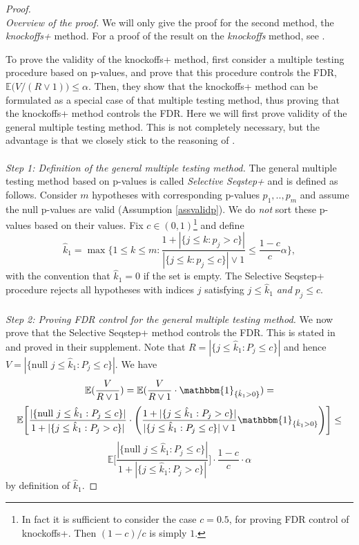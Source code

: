 \documentclass[11pt]{article}
\theoremstyle{plain}
\theoremstyle{definition}
\newcommand{\citt}{\citet}
\newcommand{\citp}{\citep}
\begin{document}
\begin{proof}
\phantom{.}
\\
\noindent \emph{Overview of the proof.}
We will only give the proof for the second  method, the \emph{knockoffs+} method. For a proof of  the result on the  \emph{knockoffs} method, see \citt{barber2015controlling}.

To prove the validity of the knockoffs+ method, \citt{barber2015controlling} first consider a multiple testing procedure based on  p-values, and prove that this procedure controls the  FDR, 
$\mathbb{E}\big(V/(R\vee1) \big)   \leq \alpha.$
Then, they show that the knockoffs+ method can be formulated as a special case of that multiple testing method, thus proving that the knockoffs+ method controls the FDR. Here we will first prove validity of the general multiple testing method. This is not completely necessary, but the advantage is that we closely stick to the reasoning of \citt{barber2015controlling}.
\\
\\
\emph{Step 1: Definition of the general multiple testing method.}
The general multiple testing method based on  p-values is called \emph{Selective Seqstep+} \citp[][p.2081]{barber2015controlling} and is defined as  follows. Consider $m$ hypotheses with corresponding p-values $p_1,..,p_m$ and assume the null p-values are valid (Assumption \ref{assvalidp}). We do \emph{not} sort these p-values based on their values.
Fix $c\in(0,1)$\footnote{In fact it is sufficient to consider the case $c=0.5$, for proving FDR control of knockoffs+. Then $(1-c)/c$ is simply $1$.} and define
$$\hat{k}_1 = \max\big\{ 1\leq k \leq m: \frac{1+|\{j\leq k: p_j>c\}|}{|\{j\leq k: p_j\leq c\}|\vee 1} \leq \frac{1-c}{c}\alpha    \big\},$$
with the convention that $\hat{k}_1 =0$ if the set is empty. The Selective Seqstep+ procedure rejects all hypotheses with indices $j$ satisfying $j \leq \hat{k}_1 $ \emph{and} $p_j\leq c$.
\\
\\
\emph{Step 2: Proving FDR control for the  general multiple testing method.}
We now prove that the Selective Seqstep+ method controls the FDR. This is stated in \citt[][Theorem 3]{barber2015controlling} and proved in their supplement.
Note that $R = |\{j\leq\hat{k}_1: P_j\leq c  \}|$ and hence $V = |\{\text{null } j\leq\hat{k}_1: P_j\leq c  \}|$. We have 
$$\mathbb{E}(\frac{V}{R\vee 1}) = \mathbb{E}(\frac{V}{R\vee 1}\cdot \mathbbm{1}_{\{\hat{k}_1>0\}})=$$
$$ \mathbb{E}\Bigg[  \frac{|\{\text{null } j\leq\hat{k}_1: P_j\leq c  \}| }{1+ |\{j\leq\hat{k}_1: P_j> c  \}|}                  \cdot     \Bigg(\frac{1+ |\{j\leq\hat{k}_1: P_j> c  \}|}{|\{j\leq\hat{k}_1: P_j\leq c  \}|\vee 1}  \mathbbm{1}_{\{\hat{k}_1>0\}}\Bigg) \Bigg] \leq $$
\begin{equation}\label{eqsupermar}
\mathbb{E}\Bigg[  \frac{|\{\text{null } j\leq\hat{k}_1: P_j\leq c  \}| }{1+ |\{j\leq\hat{k}_1: P_j> c  \}|}                    \Bigg]  \cdot  \frac{1-c}{c}\cdot  \alpha 
\end{equation}
by definition of  $\hat{k}_1$.


\end{proof}
\end{document}
